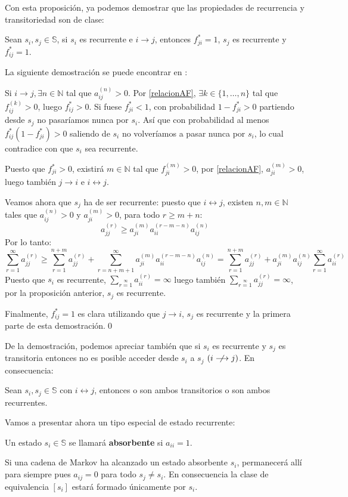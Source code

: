 Con esta proposición, ya podemos demostrar que las propiedades de recurrencia y transitoriedad son de clase:
\begin{theorem}\label{relacionEstadosRecurrentes}
    Sean $s_i, s_j\in\mathbb{S}$, si $s_i$ es recurrente e $i\longrightarrow j$, entonces $f_{ji}^*=1$, $s_j$ es recurrente y $f_{ij}^*=1$.
\end{theorem}
La siguiente demostración se puede encontrar en \cite[Página 38]{Ibarrola_1991}:
\begin{proofs*}
Si $i\longrightarrow j, \exists n\in\mathbb{N}$ tal que $a_{ij}^{(n)}>0$. Por \ref{relacionAF}, $\exists k\in\{1,\dots ,n\}$ tal que $f_{ij}^{(k)}>0$, luego $f_{ij}^*>0$. Si fuese $f_{ji}^*<1$, con probabilidad $1-f_{ji}^*>0$ partiendo desde $s_j$ no pasaríamos nunca por $s_i$. Así que con probabilidad al menos $f_{ij}^*(1-f_{ji}^*)>0$ saliendo de $s_i$ no volveríamos a pasar nunca por $s_i$, lo cual contradice con que $s_i$ sea recurrente.

Puesto que $f_{ji}^*>0$, existirá $m\in\mathbb{N}$ tal que $f_{ji}^{(m)}>0$, por \eqref{relacionAF}, $a_{ji}^{(m)}>0$, luego también $j\longrightarrow i$ e $i\longleftrightarrow j$.

Veamos ahora que $s_j$ ha de ser recurrente: puesto que $i\longleftrightarrow j$, existen $n,m \in\mathbb{N}$ tales que $a_{ij}^{(n)}>0$ y $a_{ji}^{(m)}>0$, para todo $r\geq m+n$:
\[a_{jj}^{(r)}\geq a_{ji}^{(m)}a_{ii}^{(r-m-n)}a_{ij}^{(n)}\]
Por lo tanto:
\[\sum_{r=1}^\infty a_{jj}^{(r)}\geq\sum_{r=1}^{n+m} a_{jj}^{(r)}+\sum_{r=n+m+1}^\infty a_{ji}^{(m)}a_{ii}^{(r-m-n)}a_{ij}^{(n)}=\sum_{r=1}^{n+m} a_{jj}^{(r)}+a_{ji}^{(m)}a_{ij}^{(n)}\sum_{r=1}^{\infty} a_{ii}^{(r)}\]
Puesto que $s_i$ es recurrente, $\sum\limits_{r=1}\limits^{\infty} a_{ii}^{(r)}=\infty$ luego también $\sum\limits_{r=1}\limits^{\infty} a_{jj}^{(r)}=\infty$, por la proposición anterior, $s_j$ es recurrente.

Finalmente, $f_{ij}^*=1$ es clara utilizando que $j\longrightarrow i$, $s_j$ es recurrente y la primera parte de esta demostración.\qed
\end{proofs*}

De la demostración, podemos apreciar también que si $s_i$ es recurrente y $s_j$ es transitoria entonces no es posible acceder desde $s_i$ a $s_j$  $(i\centernot\longrightarrow j)$. En consecuencia:

\begin{corollary}
    Sean $s_i, s_j\in\mathbb{S}$ con $i\longleftrightarrow j$, entonces o son ambos transitorios o son ambos recurrentes.
\end{corollary}
Vamos a presentar ahora un tipo especial de estado recurrente:
\begin{definition}
Un estado $s_i\in\mathbb{S}$ se llamará \textbf{absorbente} si $a_{ii}=1$.
\end{definition}
Si una cadena de Markov ha alcanzado un estado absorbente $s_i$, permanecerá allí para siempre pues $a_{ij}=0$ para todo $s_j\neq s_i$. En consecuencia la clase de equivalencia $[s_i]$ estará formado únicamente por $s_i$.

